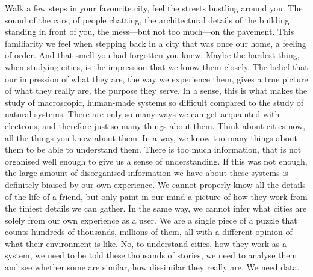 Walk a few steps in your favourite city, feel the streets bustling around you.
The sound of the cars, of people chatting, the architectural details of the
building standing in front of you, the mess---but not too much---on the
pavement. This familiarity we feel when stepping back in a city that was once
our home, a feeling of order. And that smell you had forgotten you knew. Maybe
the hardest thing, when studying cities, is the impression that we know them
closely. The belief that our impression of what they are, the way we experience
them, gives a true picture of what they really are, the purpose they serve. In a
sense, this is what makes the study of macroscopic, human-made systems so
difficult compared to the study of natural systems. There are only so many ways
we can get acquainted with electrons, and therefore just so many things about
them. Think about cities now, all the things you know about them. In a way, we
know too many things about them to be able to understand them. There is too much
information, that is not organised well enough to give us a sense of
understanding. If this was not enough, the large amount of disorganised
information we have about these systems is definitely biaised by our own
experience. We cannot properly know all the details of the life of a friend,
but only paint in our mind a picture of how they work from the tiniest details
we can gather. In the same way, we cannot infer what cities are solely from our
own experience as a user. We are a single piece of a puzzle that counts hundreds
of thousands, millions of them, all with a different opinion of what their
environment is like. No, to understand cities, how they work as a system, we
need to be told these thousands of stories, we need to analyse them and see
whether some are similar, how dissimilar they really are. We need data.\\


